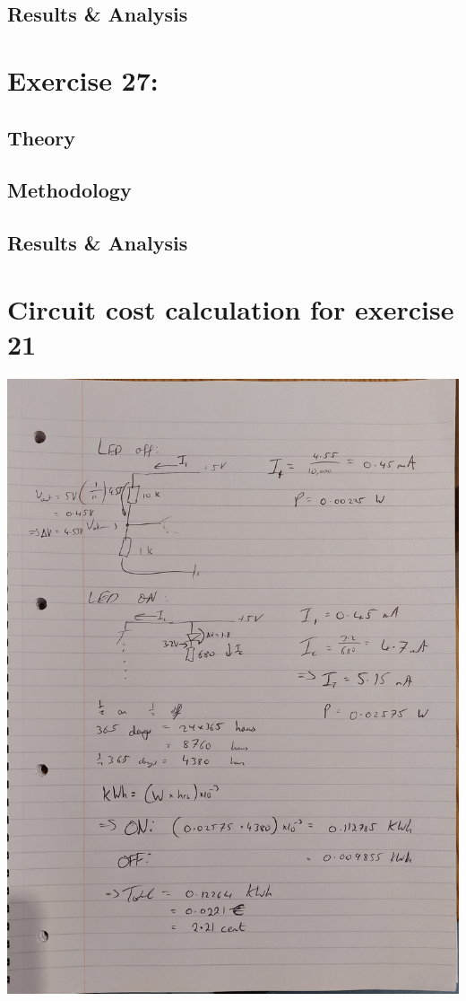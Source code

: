 \documentclass[%
reprint,
amsmath,amssymb,
aps,
floatfix
]{revtex4-2}
\begin{document}
		\subsection{Results \& Analysis}
		
	\section{Exercise 27: }
		\subsection{Theory}
		\subsection{Methodology}
		\subsection{Results \& Analysis}
		
	\clearpage
	
	\clearpage
	\onecolumngrid
	\appendix
	\section{Circuit cost calculation for exercise 21}
	\includegraphics[width=\linewidth]{ex21_calc.jpg}

	
	
\end{document}
